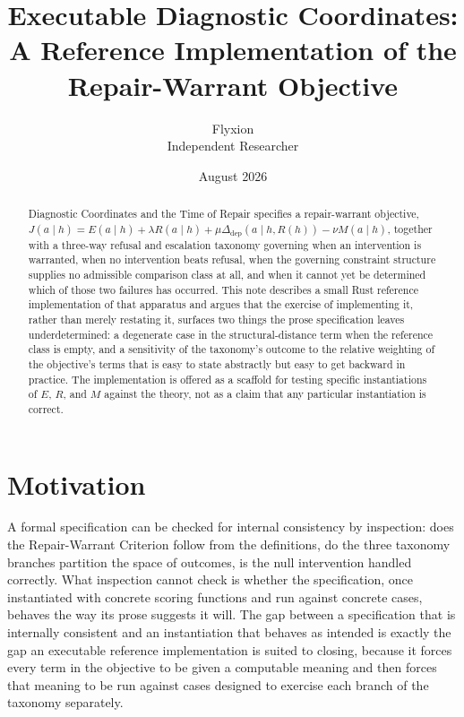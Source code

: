 \documentclass[11pt]{article}
\title{Executable Diagnostic Coordinates: A Reference Implementation of the Repair-Warrant Objective}
\author{Flyxion \\ Independent Researcher}
\date{August 2026}
\begin{document}
\maketitle

\begin{abstract}
Diagnostic Coordinates and the Time of Repair specifies a repair-warrant objective, $J(a\mid h) = E(a\mid h) + \lambda R(a\mid h) + \mu \Delta_{\text{dep}}(a\mid h, R(h)) - \nu M(a\mid h)$, together with a three-way refusal and escalation taxonomy governing when an intervention is warranted, when no intervention beats refusal, when the governing constraint structure supplies no admissible comparison class at all, and when it cannot yet be determined which of those two failures has occurred. This note describes a small Rust reference implementation of that apparatus and argues that the exercise of implementing it, rather than merely restating it, surfaces two things the prose specification leaves underdetermined: a degenerate case in the structural-distance term when the reference class is empty, and a sensitivity of the taxonomy's outcome to the relative weighting of the objective's terms that is easy to state abstractly but easy to get backward in practice. The implementation is offered as a scaffold for testing specific instantiations of $E$, $R$, and $M$ against the theory, not as a claim that any particular instantiation is correct.
\end{abstract}

\section{Motivation}

A formal specification can be checked for internal consistency by inspection: does the Repair-Warrant Criterion follow from the definitions, do the three taxonomy branches partition the space of outcomes, is the null intervention handled correctly. What inspection cannot check is whether the specification, once instantiated with concrete scoring functions and run against concrete cases, behaves the way its prose suggests it will. The gap between a specification that is internally consistent and an instantiation that behaves as intended is exactly the gap an executable reference implementation is suited to closing, because it forces every term in the objective to be given a computable meaning and then forces that meaning to be run against cases designed to exercise each branch of the taxonomy separately.
\end{document}

